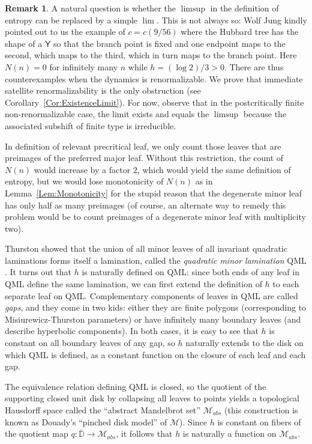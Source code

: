 \documentclass[12pt]{amsart}
\newcommand{\M}{\mathscr M}
\newcommand{\0}{\texttt{0}}
\newcommand{\1}{\texttt{1}}
\theoremstyle{definition}
\newtheorem*{remark}{Remark}
\numberwithin{equation}{section}
\newcommand{\ovl}[1]{\overline{#1}}
\begin{document}
\begin{remark}
A natural question is whether the $\limsup$ in the definition of entropy can be replaced by a simple $\lim$. This is not always so: Wolf Jung kindly pointed out to us the example of $c=c(9/56)$ where the Hubbard tree has the shape of a $\textsf{Y}$ so that the branch point is fixed and one endpoint maps to the second, which maps to the third, which in turn maps to the branch point. Here $N(n)=0$ for infinitely many $n$ while $h=(\log 2)/3>0$. There are thus counterexamples when the dynamics is renormalizable. We prove that immediate satellite renormalizability is the only obstruction (see Corollary~\ref{Cor:ExistenceLimit}). For now, observe that in the postcritically finite non-renormalizable case, the limit exists and equals the $\limsup$ because the associated subshift of finite type is irreducible.

In definition of relevant precritical leaf, we only count those leaves that are preimages of the preferred major leaf. Without this restriction, the count of $N(n)$ would increase by a factor $2$, which would yield the same definition of entropy, but we would lose monotonicity of $N(n)$ as in Lemma~\ref{Lem:Monotonicity} for the stupid reason that the degenerate minor leaf has only half as many preimages (of course, an alternate way to remedy this problem would be to count preimages of a degenerate minor leaf with multiplicity two). 
\end{remark}




Thurston showed that the union of all minor leaves of all invariant quadratic laminations forms itself a lamination, called the \emph{quadratic minor lamination} QML \cite{ThurstonLaminations}. It turns out that $h$ is naturally defined on QML: since both ends of any leaf in QML define the same lamination, we can first extend the definition of $h$ to each separate leaf on QML. Complementary components of leaves in QML are called \emph{gaps}, and they come in two kids: either they are finite polygons (corresponding to Misiurewicz-Thurston parameters) or have infinitely many boundary leaves (and describe hyperbolic components). In both cases, it is easy to see that $h$ is constant on all boundary leaves of any gap, so $h$ naturally extends to the disk on which QML is defined, as a constant function on the closure of each leaf and each gap. 

The equivalence relation defining QML is closed, so the quotient of the supporting closed unit disk by collapsing all leaves to points yields a topological Hausdorff space called the ``abstract Mandelbrot set'' $\M_{abs}$ (this construction is known as Douady's ``pinched disk model'' of $\M$). Since $h$ is constant on fibers of the quotient map $q\colon \ovl{\mathbb D} \to \M_{abs}$, it follows that $h$ is naturally a function on $\M_{abs}$. 
\end{document}
